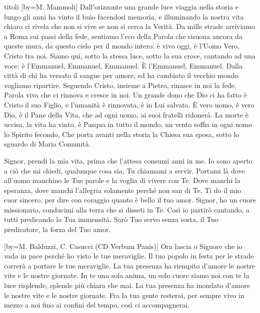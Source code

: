 \begin{songs}{titoli}
[by={M. Mammoli}]
\beginverse
Dall'orizzonte una grande luce viaggia nella storia
e lungo gli anni ha vinto il buio facendosi memoria,
e illuminando la nostra vita chiaro ci rivela
che non si vive se non si cerca la Verità.
\endverse
\beginverse
Da mille strade arriviamo a Roma sui passi della fede,
sentiamo l'eco della Parola che risuona ancora
da queste mura, da questo cielo per il mondo intero:
è vivo oggi, è l'Uomo Vero, Cristo tra noi.
\endverse
\beginchorus
Siamo qui, sotto la stessa luce, sotto la sua croce, cantando ad una voce:
è l'Emmanuel, Emmanuel, Emmanuel.
È l'Emmanuel, Emmanuel.
\endchorus
\beginverse
Dalla città di chi ha versato il sangue per amore,
ed ha cambiato il vecchio mondo vogliamo ripartire.
Seguendo Cristo, insieme a Pietro, rinasce in noi la fede,
Parola viva che ci rinnova e cresce in noi.
\endverse
\beginverse
Un grande dono che Dio ci ha fatto è Cristo il suo Figlio,
e l'umanità è rinnovata, è in Lui salvata.
È vero uomo, è vero Dio, è il Pane della Vita,
che ad ogni uomo, ai suoi fratelli ridonerà.
\endverse
\beginverse
La morte è uccisa, la vita ha vinto, è Pasqua in tutto il mondo,
un vento soffia in ogni uomo lo Spirito fecondo,
Che porta avanti nella storia la Chiesa sua sposa,
sotto lo sguardo di Maria Comunità.
\endverse
\endsong

\beginverse
Signor, prendi la mia vita,
prima che l'attesa consumi anni in me.
Io sono aperto a ciò che mi chiedi,
qualunque cosa sia, Tu chiamami a servir.
\endverse
\beginchorus
Portami là dove all'uomo manchino le Tue parole
e la voglia di vivere con Te.
Dove manchi la speranza, dove manchi l'allegria
solamente perché non san di Te.
\endchorus
\beginverse
Ti do il mio cuor sincero,
per dire con coraggio quanto è bello il tuo amor.
Signor, ho un cuore missionario,
conducimi alla terra che si disseti in Te.
\endverse
\beginverse
Così io partirò cantando,
a tutti predicando la Tua immensità.
Sarò Tuo servo senza sosta,
il Tuo predicatore, la forza del Tuo amor.
\endverse
\endsong

[by={M. Balduzzi, C. Casucci (CD Verbum Panis)}]
\beginchorus
Ora lascia o Signore che io vada in pace perché ho visto le tue meraviglie.
Il tuo popolo in festa per le strade correrà a portare le tue meraviglie.
\endchorus
\beginverse
La tua presenza ha riempito d'amore le nostre vite e le nostre giornate.
In te una sola anima, un solo cuore siamo noi
con te la luce risplende, splende più chiara che mai.
\endverse
\beginverse
La tua presenza ha inondato d'amore le nostre vite e le nostre giornate.
Fra la tua gente resterai, per sempre vivo in mezzo a noi
fino ai confini del tempo, così ci accompagnerai.
\endverse
\endsong


\end{songs}
